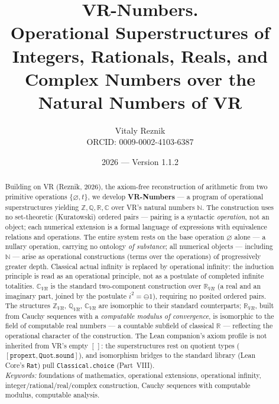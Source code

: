 \documentclass[11pt]{article}
\title{\textbf{VR-Numbers.}\\[2pt]
\large Operational Superstructures of Integers, Rationals, Reals, and Complex Numbers
over the Natural Numbers of VR}
\author{Vitaly Reznik\\ \small ORCID: 0009-0002-4103-6387}
\date{2026 --- Version 1.1.2}
\theoremstyle{definition}
\newcommand{\zero}{\varnothing}
\newcommand{\Z}{\mathbb{Z}}
\newcommand{\Q}{\mathbb{Q}}
\newcommand{\R}{\mathbb{R}}
\newcommand{\C}{\mathbb{C}}
\newcommand{\N}{\mathbb{N}}
\newcommand{\isub}{\ominus}              %
\begin{document}
\maketitle

\begin{abstract}
Building on VR (Reznik, 2026), the axiom-free reconstruction of arithmetic from two primitive
operations $\{\zero,t\}$, we develop \textbf{VR-Numbers} --- a program of operational
superstructures yielding $\Z,\Q,\R,\C$ over VR's natural numbers $\N$. The construction uses no set-theoretic
(Kuratowski) ordered pairs --- pairing is a syntactic \emph{operation}, not an object; each numerical
extension is a formal language of expressions
with equivalence relations and operations. The entire system rests on the base operation $\zero$
alone --- a nullary operation, carrying no ontology \emph{of substance}; all numerical objects --- including $\N$ ---
arise as operational constructions (terms over the operations) of progressively greater depth.
Classical actual infinity is replaced by operational infinity: the induction principle is read as an
operational principle, not as a postulate of completed infinite totalities. $\C_{VR}$ is the standard
two-component construction over $\R_{VR}$ (a real and an imaginary part, joined by the postulate
$i^2=\isub 1$), requiring no posited ordered pairs. The
structures $\Z_{VR}$, $\Q_{VR}$, $\C_{VR}$ are isomorphic to their standard counterparts;
$\R_{VR}$, built from Cauchy sequences with a \emph{computable modulus of convergence}, is
isomorphic to the field of computable real numbers --- a countable subfield of classical $\R$ ---
reflecting the operational character of the construction. The Lean companion's axiom profile is not
inherited from VR's empty $[\,]$: the superstructures rest on quotient types
($[\texttt{propext}, \texttt{Quot.sound}]$), and isomorphism bridges to the standard
library (Lean Core's \texttt{Rat}) pull \texttt{Classical.choice} (Part~VIII).
\\[3pt]
\emph{Keywords:} foundations of mathematics, operational extensions, operational infinity,
integer/rational/real/complex construction, Cauchy sequences with computable modulus, computable analysis.
\\[3pt]

\end{abstract}
\end{document}
